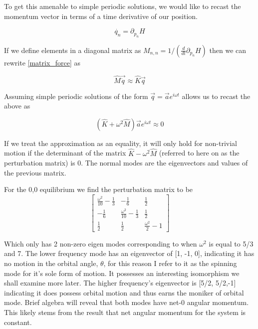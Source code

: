 \documentclass[12pt]{amsart}
\begin{document}
To get this amenable to simple periodic solutions, we would like to recast the momentum vector in terms of a time derivative of our position.

\begin{equation}
	\dot{ q_n } = \partial_{p_n} H
\end{equation}

If we define elements in a diagonal matrix as 
$M_{n,n}=1/(\frac{d}{dt} \partial_{p_n} H)$
then we can rewrite \ref{matrix_force} as 

\begin{equation}
	\widehat M \vec{ \ddot{ q }} \approx \widehat K \vec q
\end{equation}

Assuming simple periodic solutions of the form $\vec q = \vec a e^{i\omega t}$ allows us to recast the above as

\begin{equation}
	( 
	\widehat K + \omega^2 \widehat M
	)  \vec{ a}e^{i\omega t} \approx 0
\end{equation}

If we treat the approximation as an equality, it will only hold for non-trivial motion if the determinant of the matrix $\widehat K - \omega^2 \widehat M$ (referred to here on as the perturbation matrix) is 0. The normal modes are the eigenvectors and values of the previous matrix.

For the 0,0 equilibrium we find the perturbation matrix to be
\begin{equation}
	\left[\begin{matrix}\frac{\omega^{2}}{10} - \frac{1}{3} & - \frac{1}{6} & \frac{1}{2}\\
	- \frac{1}{6} & \frac{\omega^{2}}{10} - \frac{1}{3} & \frac{1}{2}\\
	\frac{1}{2} & \frac{1}{2} & \frac{\omega^{2}}{2} - 1\end{matrix}\right]
\end{equation}

Which only has 2 non-zero eigen modes corresponding to when $\omega^2$ is equal to 5/3 and 7. The lower frequency mode has an eigenvector of [1, -1, 0], indicating it has no motion in the orbital angle, $\theta$, for this reason I refer to it as the spinning mode for it's sole form of motion. It possesses an interesting isomorphism we shall examine more later. The higher frequency's eigenvector is [5/2, 5/2,-1] indicating it does possess orbital motion and thus earns the moniker of orbital mode. Brief algebra will reveal that both modes have net-0 angular momentum. This likely stems from the result that net angular momentum for the system is constant.
\end{document}
